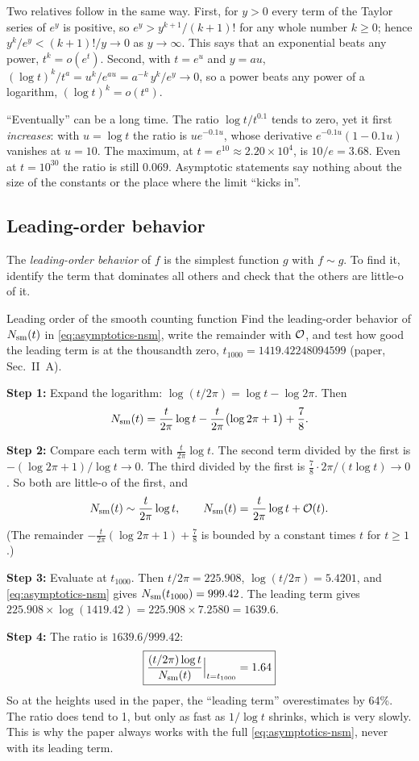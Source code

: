 Two relatives follow in the same way. First, for $y>0$ every term of the Taylor series of $e^y$ is positive, so $e^y>y^{k+1}/(k+1)!$ for any whole number $k\ge0$; hence $y^k/e^y<(k+1)!/y\to0$ as $y\to\infty$. This says that an exponential beats any power, $t^k=o(e^{t})$. Second, with $t=e^u$ and $y=au$, $(\log t)^k/t^a=u^k/e^{au}=a^{-k}\,y^k/e^y\to0$, so a power beats any power of a logarithm, $(\log t)^k=o(t^a)$.

\begin{pitfall}
``Eventually'' can be a long time. The ratio $\log t/t^{0.1}$ tends to zero, yet it first \emph{increases}: with $u=\log t$ the ratio is $u e^{-0.1u}$, whose derivative $e^{-0.1u}(1-0.1u)$ vanishes at $u=10$. The maximum, at $t=e^{10}\approx2.20\times10^{4}$, is $10/e=3.68$. Even at $t=10^{30}$ the ratio is still $0.069$. Asymptotic statements say nothing about the size of the constants or the place where the limit ``kicks in''.
\end{pitfall}

\subsection{Leading-order behavior}

The \emph{leading-order behavior} of $f$ is the simplest function $g$ with $f\sim g$. To find it, identify the term that dominates all others and check that the others are little-o of it.

\begin{sample}{Leading order of the smooth counting function}
Find the leading-order behavior of $N_{\mathrm{sm}}(t)$ in \cref{eq:asymptotics-nsm}, write the remainder with $\mathcal{O}$, and test how good the leading term is at the thousandth zero, $t_{1000}=1419.42248094599$ (paper, Sec.~II~A).

\textbf{Step 1:} Expand the logarithm: $\log(t/2\pi)=\log t-\log2\pi$. Then
\[
N_{\mathrm{sm}}(t)=\frac{t}{2\pi}\log t-\frac{t}{2\pi}\bigl(\log 2\pi+1\bigr)+\frac78 .
\]

\textbf{Step 2:} Compare each term with $\frac{t}{2\pi}\log t$. The second term divided by the first is $-(\log2\pi+1)/\log t\to0$. The third divided by the first is $\tfrac78\cdot2\pi/(t\log t)\to0$. So both are little-o of the first, and
\[
N_{\mathrm{sm}}(t)\sim\frac{t}{2\pi}\log t,\qquad N_{\mathrm{sm}}(t)=\frac{t}{2\pi}\log t+\mathcal{O}(t).
\]
(The remainder $-\frac{t}{2\pi}(\log2\pi+1)+\frac78$ is bounded by a constant times $t$ for $t\ge1$.)

\textbf{Step 3:} Evaluate at $t_{1000}$. Then $t/2\pi=225.908$, $\log(t/2\pi)=5.4201$, and \cref{eq:asymptotics-nsm} gives $N_{\mathrm{sm}}(t_{1000})=999.42$. The leading term gives $225.908\times\log(1419.42)=225.908\times7.2580=1639.6$.

\textbf{Step 4:} The ratio is $1639.6/999.42$:
\[
\boxed{\frac{(t/2\pi)\log t}{N_{\mathrm{sm}}(t)}\Big|_{t=t_{1000}}=1.64}
\]
So at the heights used in the paper, the ``leading term'' overestimates by 64\%. The ratio does tend to 1, but only as fast as $1/\log t$ shrinks, which is very slowly. This is why the paper always works with the full \cref{eq:asymptotics-nsm}, never with its leading term.
\end{sample}

